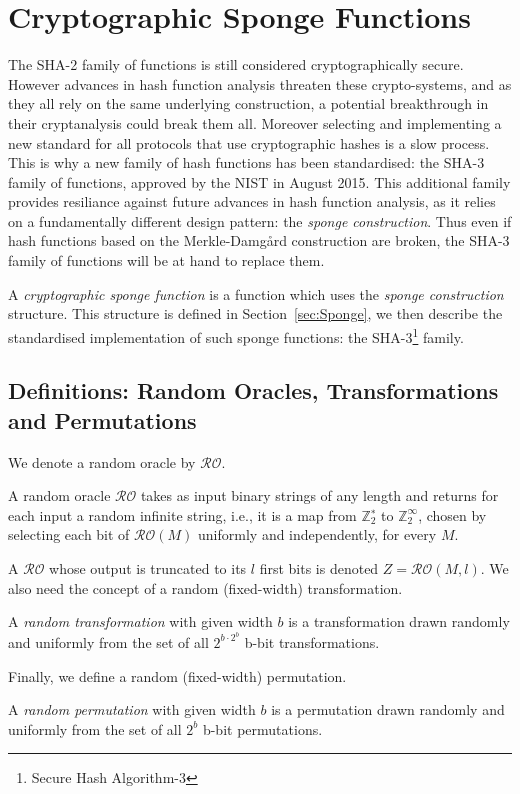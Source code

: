 \chapter{Cryptographic Sponge Functions}\label{chap:Sponge}
The SHA-2 family of functions is still considered cryptographically secure. However advances in hash function analysis threaten these crypto-systems, and as they all rely on the same underlying construction, a potential breakthrough in their cryptanalysis could break them all. Moreover selecting and implementing a new standard for all protocols that use cryptographic hashes is a slow process. This is why a new family of hash functions has been standardised: the SHA-3 family of functions, approved by the NIST in August 2015. This additional family provides resiliance against future advances in hash function analysis, as it relies on a fundamentally different design pattern: the \emph{sponge construction}.
Thus even if hash functions based on the Merkle-Damg\r{a}rd construction are broken, the SHA-3 family of functions will be at hand to replace them.

A \emph{cryptographic sponge function} is a function which uses the \emph{sponge construction} structure. This structure is defined in Section~\ref{sec:Sponge}, we then describe the standardised implementation of such sponge functions: the SHA-3\footnote{Secure Hash Algorithm-3} family.

\section{Definitions: Random Oracles, Transformations and Permutations}
We denote a random oracle by $\mathcal{RO}$.
\begin{defn} A random oracle $\mathcal{RO}$ takes as input binary strings of any length and returns for each input a random infinite string, i.e., it is a map from $\mathbb{Z}_2^∗$ to $\mathbb{Z}_2^{\infty}$, chosen by selecting each bit of $\mathcal{RO}(M)$ uniformly and independently, for every $M$.
\end{defn}
A $\mathcal{RO}$ whose output is truncated to its $l$ first bits is denoted $Z = \mathcal{RO}(M, l)$. 
We also need the concept of a random (fixed-width) transformation.
\begin{defn} A \emph{random transformation} with given width $b$ is a transformation drawn randomly and uniformly from the set of all $2^{b\cdot 2^b}$ b-bit transformations.
\end{defn}
Finally, we define a random (fixed-width) permutation.
\begin{defn} A \emph{random permutation} with given width $b$ is a permutation drawn randomly and uniformly from the set of all $2^b\!$ b-bit permutations.
\end{defn}

